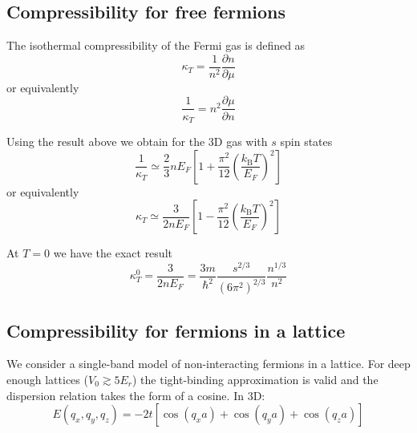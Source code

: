 \documentclass[11pt,letter]{article}
\newcommand{\kb}{\ensuremath{k_{\text{B}}}}
\begin{document}
\subsection{ Compressibility for free fermions} 

The isothermal compressibility of the Fermi gas is defined as 
\begin{equation} 
  \kappa_{T}  = \frac{1}{n^{2}} \frac{ \partial n }{ \partial \mu } 
\end{equation}  
or equivalently 
\begin{equation}
  \frac{1}{\kappa_{T}}  =  n^{2} \frac{ \partial \mu }{ \partial n }
\end{equation}  

Using the result above we obtain for the 3D gas with $s$ spin states
\begin{equation}
  \frac{1}{\kappa_{T}}  \simeq \frac{2}{3} n E_{F} 
   \left[ 1 + \frac{\pi^{2}}{12} \left( \frac{\kb T}{E_{F} } \right)^{2} \right]
\end{equation}  
or equivalently 
\begin{equation} 
   \kappa_{T} \simeq \frac{ 3}{ 2 n E_{F}} 
 \left[ 1 - \frac{\pi^{2}}{12} \left( \frac{ \kb T}{ E_{F} } \right)^{2} \right]
\end{equation}

At $T=0$ we have the exact result 
\begin{equation}
  \kappa_{T}^{0}  =  \frac{ 3}{ 2 n E_{F} } = 
   \frac{ 3 m }{\hbar^{2}}  \frac{ s^{2/3} }{ ( 6\pi^{2} )^{2/3}} 
   \frac{ n^{1/3} }{n^{2} } 
\end{equation}

\subsection{ Compressibility for fermions in a lattice} 

We consider a single-band model of non-interacting fermions in a lattice.   For
deep enough lattices ($V_{0}\gtrsim5 E_{r}$) the tight-binding approximation
is valid and the dispersion relation takes the form of a cosine.  In 3D:
\begin{equation}
 E(q_{x}, q_{y}, q_{z} ) =  -2t \left[ \cos(q_{x} a) + \cos(q_{y} a) 
    + \cos(q_{z} a ) \right]
\end{equation}
\end{document}
